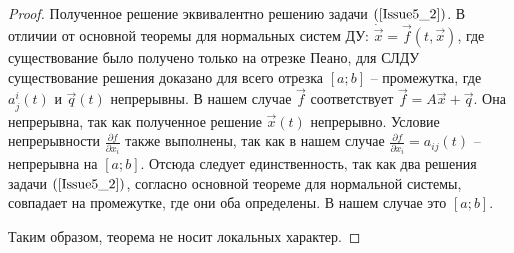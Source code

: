 \begin{proof}
Полученное решение эквивалентно решению задачи $(\ref{Issue5_2})$. В отличии от основной теоремы для нормальных систем ДУ: $\dot{\overrightarrow{x}} = \overrightarrow{f}(t, \overrightarrow{x})$, где существование было получено только на отрезке Пеано, для СЛДУ существование решения доказано для всего отрезка $[a;b]$ -- промежутка, где $a_j^i(t)$ и $\overrightarrow{q}(t)$ непрерывны. В нашем случае $\overrightarrow{f}$ соответствует $\overrightarrow{f} = A\overrightarrow{x} + \overrightarrow{q}$. Она непрерывна, так как полученное решение $\overrightarrow{x}(t)$ непрерывно. Условие непрерывности $\frac{\partial f}{\partial x_i}$ также выполнены, так как в нашем случае $\frac{\partial f}{\partial x_i} = a_{ij}(t)$ -- непрерывна на $[a;b]$. Отсюда следует единственность, так как два решения задачи $(\ref{Issue5_2})$, согласно основной теореме для нормальной системы, совпадает на промежутке, где они оба определены. В нашем случае это $[a;b]$.

Таким образом, теорема не носит локальных характер.

\end{proof}
